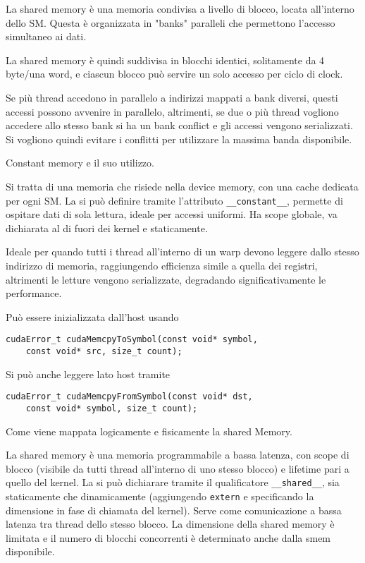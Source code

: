 \begin{questions}
    \begin{solution}
        La shared memory è una memoria condivisa a livello di blocco, locata all'interno dello SM. Questa è organizzata in "banks" paralleli che permettono l'accesso simultaneo ai dati.
        
        La shared memory è quindi suddivisa in blocchi identici, solitamente da 4 byte/una word, e ciascun blocco può servire un solo accesso per ciclo di clock. 
        
        Se più thread accedono in parallelo a indirizzi mappati a bank diversi, questi accessi possono avvenire in parallelo, altrimenti, se due o più thread vogliono accedere allo stesso bank si ha un bank conflict e gli accessi vengono serializzati. Si vogliono quindi evitare i conflitti per utilizzare la massima banda disponibile.
    \end{solution}
    
    \question Constant memory e il suo utilizzo.
    
    \begin{solution}
        Si tratta di una memoria che risiede nella device memory, con una cache dedicata per ogni SM. La si può definire tramite l'attributo \texttt{\_\_constant\_\_}, permette di ospitare dati di sola lettura, ideale per accessi uniformi. Ha scope globale, va dichiarata al di fuori dei kernel e staticamente.
        
        Ideale per quando tutti i thread all'interno di un warp devono leggere dallo stesso indirizzo di memoria, raggiungendo efficienza simile a quella dei registri, altrimenti le letture vengono serializzate, degradando significativamente le performance.
        
        Può essere inizializzata dall'host usando
        \begin{verbatim}
cudaError_t cudaMemcpyToSymbol(const void* symbol,
    const void* src, size_t count);
        \end{verbatim}
        Si può anche leggere lato host tramite
        \begin{verbatim}
cudaError_t cudaMemcpyFromSymbol(const void* dst, 
    const void* symbol, size_t count);
        \end{verbatim}
    \end{solution}
    
    \question Come viene mappata logicamente e fisicamente la shared Memory.
    
    \begin{solution}
        La shared memory è una memoria programmabile a bassa latenza, con scope di blocco (visibile da tutti thread all'interno di uno stesso blocco) e lifetime pari a quello del kernel. La si può dichiarare tramite il qualificatore \texttt{\_\_shared\_\_}, sia staticamente che dinamicamente (aggiungendo \texttt{extern} e specificando la dimensione in fase di chiamata del kernel). Serve come comunicazione a bassa latenza tra thread dello stesso blocco. La dimensione della shared memory è limitata e il numero di blocchi concorrenti è determinato anche dalla smem disponibile.
        

\end{solution}
\end{questions}
